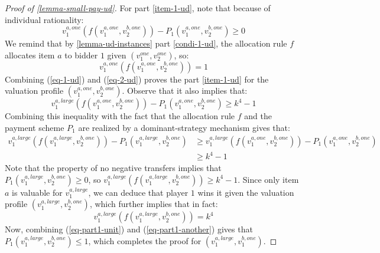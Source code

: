 \begin{proof}[Proof of \cref{lemma-small-pay-ud}]
    
For part \ref{item-1-ud}, note that because of individual rationality:
\begin{equation}\label{eq-1-ud}
 v_1^{a,one}(f(v_1^{a,one},v_2^{b,one}))-P_1(v_1^{a,one},v_2^{b,one})\ge 0   
\end{equation}
We remind that by \cref{lemma-ud-instances} part \ref{condi-1-ud}, 
the allocation rule $f$ allocates item $a$ to bidder $1$ given $(v_1^{one},v_2^{one})$, so:
\begin{equation}\label{eq-2-ud}
 v_1^{a,one}(f(v_1^{a,one},v_2^{b,one}))=1   
\end{equation}
Combining (\ref{eq-1-ud}) and (\ref{eq-2-ud}) proves the part \ref{item-1-ud} for the valuation profile $(v_1^{a,one},v_2^{b,one})$.
Observe that it also implies that: 
\begin{equation*}\label{mid-one-eq-ud}
v_1^{a,large}(f(v_1^{a,one},v_2^{b,one}))-P_1(v_1^{a,one},v_2^{b,one})\ge k^4-1
\end{equation*}
Combining this inequality with the fact that the allocation rule $f$ and the payment scheme $P_1$ are realized by a dominant-strategy mechanism gives that:
\begin{equation}\label{eq-part1-unit}
\begin{aligned}
    v_1^{a,large}(f(v_1^{a,large},v_2^{b,one}))-P_1(v_1^{a,large},v_2^{b,one})&\ge v_1^{a,large}(f(v_1^{a,one},v_2^{b,one}))-P_1(v_1^{a,one},v_2^{b,one}) \\
    &\ge k^4-1 
\end{aligned}  
\end{equation}
Note that the property of no negative transfers implies that $P_1(v_1^{a,large},v_2^{b,one})\ge 0$, so
$v_1^{a,large}(f(v_1^{a,large},\allowbreak v_2^{b,one}))\ge k^4-1$. Since only item $a$ is valuable for  $v_1^{a,large}$, we can deduce that player $1$ wins it given the valuation profile $(v_1^{a,large}\allowbreak,v_2^{b,one})$, which further implies that in fact:
\begin{equation}\label{eq-part1-another}
v_1^{a,large}(f(v_1^{a,large}\allowbreak,v_2^{b,one}))= k^4    
\end{equation}
Now, combining (\ref{eq-part1-unit}) and (\ref{eq-part1-another}) gives that $P_1(v_1^{a,large},v_2^{b,one})\le 1$, which completes the proof for $(v_1^{a,large},v_1^{b,one})$. 


\end{proof}
